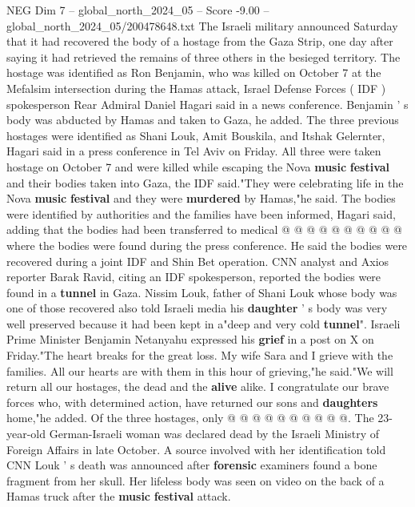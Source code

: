 \begin{textsample}{NEG Dim 7 – global\_north\_2024\_05 – Score -9.00 – global\_north\_2024\_05/200478648.txt}  \label{ex:f7_neg_185}
The Israeli military announced Saturday that it had recovered the body of a hostage from the Gaza Strip, one day after saying it had retrieved the remains of three others in the besieged territory.
The hostage was identified as Ron Benjamin, who was killed on October 7 at the Mefalsim intersection during the Hamas attack, Israel Defense Forces ( IDF ) spokesperson Rear Admiral Daniel Hagari said in a news conference.
Benjamin ' s body was abducted by Hamas and taken to Gaza, he added.
The three previous hostages were identified as Shani Louk, Amit Bouskila, and Itshak Gelernter, Hagari said in a press conference in Tel Aviv on Friday.
All three were taken hostage on October 7 and were killed while escaping the Nova \textbf{music} \textbf{festival} and their bodies taken into Gaza, the IDF said."They were celebrating life in the Nova \textbf{music} \textbf{festival} and they were \textbf{murdered} by Hamas,"he said.
The bodies were identified by authorities and the families have been informed, Hagari said, adding that the bodies had been transferred to medical @ @ @ @ @ @ @ @ @ @ where the bodies were found during the press conference.
He said the bodies were recovered during a joint IDF and Shin Bet operation.
CNN analyst and Axios reporter Barak Ravid, citing an IDF spokesperson, reported the bodies were found in a \textbf{tunnel} in Gaza.
Nissim Louk, father of Shani Louk whose body was one of those recovered also told Israeli media his \textbf{daughter} ' s body was very well preserved because it had been kept in a"deep and very cold \textbf{tunnel}".
Israeli Prime Minister Benjamin Netanyahu expressed his \textbf{grief} in a post on X on Friday."The heart breaks for the great loss.
My wife Sara and I grieve with the families.
All our hearts are with them in this hour of grieving,"he said."We will return all our hostages, the dead and the \textbf{alive} alike.
I congratulate our brave forces who, with determined action, have returned our sons and \textbf{daughters} home,"he added.
Of the three hostages, only @ @ @ @ @ @ @ @ @ @.
The 23-year-old German-Israeli woman was declared dead by the Israeli Ministry of Foreign Affairs in late October.
A source involved with her identification told CNN Louk ' s death was announced after \textbf{forensic} examiners found a bone fragment from her skull.
Her lifeless body was seen on video on the back of a Hamas truck after the \textbf{music} \textbf{festival} attack.

\end{textsample}

